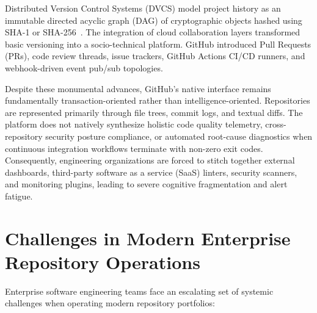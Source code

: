 Distributed Version Control Systems (DVCS) model project history as an immutable directed acyclic graph (DAG) of cryptographic objects hashed using SHA-1 or SHA-256~\cite{chacon2014pro}. The integration of cloud collaboration layers transformed basic versioning into a socio-technical platform. GitHub introduced Pull Requests (PRs), code review threads, issue trackers, GitHub Actions CI/CD runners, and webhook-driven event pub/sub topologies.

Despite these monumental advances, GitHub's native interface remains fundamentally transaction-oriented rather than intelligence-oriented. Repositories are represented primarily through file trees, commit logs, and textual diffs. The platform does not natively synthesize holistic code quality telemetry, cross-repository security posture compliance, or automated root-cause diagnostics when continuous integration workflows terminate with non-zero exit codes. Consequently, engineering organizations are forced to stitch together external dashboards, third-party software as a service (SaaS) linters, security scanners, and monitoring plugins, leading to severe cognitive fragmentation and alert fatigue.

\section{Challenges in Modern Enterprise Repository Operations}
\label{sec:challenges}

Enterprise software engineering teams face an escalating set of systemic challenges when operating modern repository portfolios:

